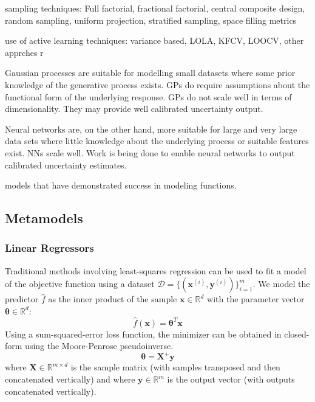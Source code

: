 \documentclass[conference]{IEEEtran}
\begin{document}
	sampling techniques: Full factorial, fractional factorial, central composite design, random sampling, uniform projection, stratified sampling, space filling metrics
	
	use of active learning techniques: variance based, LOLA, KFCV, LOOCV, other apprches
	r
	
	Gaussian processes are suitable for modelling small datasets where some prior knowledge of the generative process exists. GPs do require assumptions about the functional form of the underlying response. GPs do not scale well in terms of dimensionality. They may provide well calibrated uncertainty output.

    Neural networks are, on the other hand, more suitable for large and very large data sets where little knowledge about the underlying process or suitable features exist. NNs scale well. Work is being done to enable neural networks to output calibrated uncertainty estimates.
    
    models that have demonstrated success in modeling functions.
    
    \subsection{Metamodels}
    
    \subsubsection{Linear Regressors}
    
    Traditional methods involving least-squares regression can be used to fit a model of the objective function using a dataset $\mathcal{D} = \{ (\boldsymbol{x}^{(i)}, \boldsymbol{y}^{(i)}) \}_{i=1}^m$. We model the predictor $\hat f$ as the inner product of the sample $\boldsymbol x \in \mathbb{R}^d$ with the parameter vector $\boldsymbol \theta \in \mathbb{R}^d$:
    \begin{equation}
        \hat f(\boldsymbol x) = \boldsymbol \theta ^T \boldsymbol x
    \end{equation}
	Using a sum-squared-error loss function, the minimizer can be obtained in closed-form using the Moore-Penrose pseudoinverse.
	\begin{equation}
	    \boldsymbol{\theta} = \boldsymbol{X}^+ \boldsymbol{y}
	\end{equation}
	where $\boldsymbol X \in \mathbb{R}^{m \times d}$ is the sample matrix (with samples transposed and then concatenated vertically) and where $\boldsymbol y \in \mathbb{R}^m$ is the output vector (with outputs concatenated vertically). 
\end{document}
